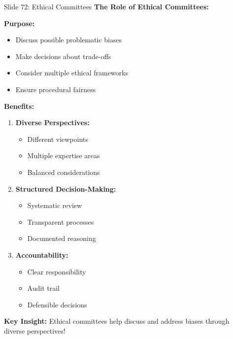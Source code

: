 \documentclass[8pt]{beamer}
\begin{document}
	\begin{frame}{Slide 72: Ethical Committees}
		\fontsize{6.5}{7.5}\selectfont
		\textbf{The Role of Ethical Committees:}
		
		\vspace{0.1cm}
		\textbf{Purpose:}
		\begin{itemize}
			\item Discuss possible problematic biases
			\item Make decisions about trade-offs
			\item Consider multiple ethical frameworks
			\item Ensure procedural fairness
		\end{itemize}
		
		\vspace{0.1cm}
		\textbf{Benefits:}
		\begin{enumerate}
			\item \textbf{Diverse Perspectives:}
			\begin{itemize}
				\item Different viewpoints
				\item Multiple expertise areas
				\item Balanced considerations
			\end{itemize}
			\item \textbf{Structured Decision-Making:}
			\begin{itemize}
				\item Systematic review
				\item Transparent processes
				\item Documented reasoning
			\end{itemize}
			\item \textbf{Accountability:}
			\begin{itemize}
				\item Clear responsibility
				\item Audit trail
				\item Defensible decisions
			\end{itemize}
		\end{enumerate}
		
		\textcolor{myblue}{\textbf{Key Insight:}} Ethical committees help \textcolor{myblue}{discuss and address biases} through diverse perspectives!
	\end{frame}
	
\end{document}
